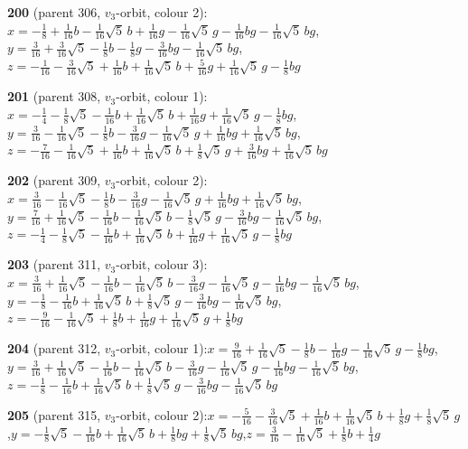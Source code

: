 \documentclass[10pt]{article}
\begin{document}
{\noindent\textbf{200} (parent 306, $v_3$-orbit, colour 2):\quad $x=-\tfrac{1}{8}+\tfrac{1}{16}b-\tfrac{1}{16}\sqrt5\,b+\tfrac{1}{16}g-\tfrac{1}{16}\sqrt5\,g-\tfrac{1}{16}bg-\tfrac{1}{16}\sqrt5\,bg$,\quad $y=\tfrac{3}{16}+\tfrac{3}{16}\sqrt5-\tfrac{1}{8}b-\tfrac{1}{8}g-\tfrac{3}{16}bg-\tfrac{1}{16}\sqrt5\,bg$,\quad $z=-\tfrac{1}{16}-\tfrac{3}{16}\sqrt5+\tfrac{1}{16}b+\tfrac{1}{16}\sqrt5\,b+\tfrac{5}{16}g+\tfrac{1}{16}\sqrt5\,g-\tfrac{1}{8}bg$\par\smallskip
\noindent\textbf{201} (parent 308, $v_3$-orbit, colour 1):\quad $x=-\tfrac{1}{4}-\tfrac{1}{8}\sqrt5-\tfrac{1}{16}b+\tfrac{1}{16}\sqrt5\,b+\tfrac{1}{16}g+\tfrac{1}{16}\sqrt5\,g-\tfrac{1}{8}bg$,\quad $y=\tfrac{3}{16}-\tfrac{1}{16}\sqrt5-\tfrac{1}{8}b-\tfrac{3}{16}g-\tfrac{1}{16}\sqrt5\,g+\tfrac{1}{16}bg+\tfrac{1}{16}\sqrt5\,bg$,\quad $z=-\tfrac{7}{16}-\tfrac{1}{16}\sqrt5+\tfrac{1}{16}b+\tfrac{1}{16}\sqrt5\,b+\tfrac{1}{8}\sqrt5\,g+\tfrac{3}{16}bg+\tfrac{1}{16}\sqrt5\,bg$\par\smallskip
\noindent\textbf{202} (parent 309, $v_3$-orbit, colour 2):\quad $x=\tfrac{3}{16}-\tfrac{1}{16}\sqrt5-\tfrac{1}{8}b-\tfrac{3}{16}g-\tfrac{1}{16}\sqrt5\,g+\tfrac{1}{16}bg+\tfrac{1}{16}\sqrt5\,bg$,\quad $y=\tfrac{7}{16}+\tfrac{1}{16}\sqrt5-\tfrac{1}{16}b-\tfrac{1}{16}\sqrt5\,b-\tfrac{1}{8}\sqrt5\,g-\tfrac{3}{16}bg-\tfrac{1}{16}\sqrt5\,bg$,\quad $z=-\tfrac{1}{4}-\tfrac{1}{8}\sqrt5-\tfrac{1}{16}b+\tfrac{1}{16}\sqrt5\,b+\tfrac{1}{16}g+\tfrac{1}{16}\sqrt5\,g-\tfrac{1}{8}bg$\par\smallskip
\noindent\textbf{203} (parent 311, $v_3$-orbit, colour 3):\quad $x=\tfrac{3}{16}+\tfrac{1}{16}\sqrt5-\tfrac{1}{16}b-\tfrac{1}{16}\sqrt5\,b-\tfrac{3}{16}g-\tfrac{1}{16}\sqrt5\,g-\tfrac{1}{16}bg-\tfrac{1}{16}\sqrt5\,bg$,\quad $y=-\tfrac{1}{8}-\tfrac{1}{16}b+\tfrac{1}{16}\sqrt5\,b+\tfrac{1}{8}\sqrt5\,g-\tfrac{3}{16}bg-\tfrac{1}{16}\sqrt5\,bg$,\quad $z=-\tfrac{9}{16}-\tfrac{1}{16}\sqrt5+\tfrac{1}{8}b+\tfrac{1}{16}g+\tfrac{1}{16}\sqrt5\,g+\tfrac{1}{8}bg$\par\smallskip
\noindent\textbf{204} (parent 312, $v_3$-orbit, colour 1):\quad $x=\tfrac{9}{16}+\tfrac{1}{16}\sqrt5-\tfrac{1}{8}b-\tfrac{1}{16}g-\tfrac{1}{16}\sqrt5\,g-\tfrac{1}{8}bg$,\quad $y=\tfrac{3}{16}+\tfrac{1}{16}\sqrt5-\tfrac{1}{16}b-\tfrac{1}{16}\sqrt5\,b-\tfrac{3}{16}g-\tfrac{1}{16}\sqrt5\,g-\tfrac{1}{16}bg-\tfrac{1}{16}\sqrt5\,bg$,\quad $z=-\tfrac{1}{8}-\tfrac{1}{16}b+\tfrac{1}{16}\sqrt5\,b+\tfrac{1}{8}\sqrt5\,g-\tfrac{3}{16}bg-\tfrac{1}{16}\sqrt5\,bg$\par\smallskip
\noindent\textbf{205} (parent 315, $v_3$-orbit, colour 2):\quad $x=-\tfrac{5}{16}-\tfrac{3}{16}\sqrt5+\tfrac{1}{16}b+\tfrac{1}{16}\sqrt5\,b+\tfrac{1}{8}g+\tfrac{1}{8}\sqrt5\,g$,\quad $y=-\tfrac{1}{8}\sqrt5-\tfrac{1}{16}b+\tfrac{1}{16}\sqrt5\,b+\tfrac{1}{8}bg+\tfrac{1}{8}\sqrt5\,bg$,\quad $z=\tfrac{3}{16}-\tfrac{1}{16}\sqrt5+\tfrac{1}{8}b+\tfrac{1}{4}g$\par\smallskip
}
\end{document}
